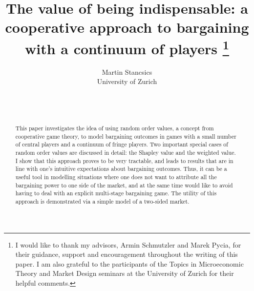 \documentclass[a4paper]{article}
\title{%
    The value of being indispensable: a cooperative approach to bargaining with a continuum of players%
    \thanks{
        I would like to thank my advisors, Armin Schmutzler and Marek Pycia, for their guidance, support and encouragement throughout the writing of this paper.
        I am also grateful to the participants of the Topics in Microeconomic Theory and Market Design seminars at the University of Zurich for their helpful comments.
    }
}
\author{Martin Stancsics \\ \normalsize{University of Zurich}}
\date{\thisdraft \\ \firstdraft \\ \latestversion}
\begin{document}
\maketitle

\begin{abstract}
    This paper investigates the idea of using random order values, a concept from cooperative game theory, to model bargaining outcomes in games with a small number of central players and a continuum of fringe players.
    Two important special cases of random order values are discussed in detail: the Shapley value and the weighted value.
    I show that this approach proves to be very tractable, and leads to results that are in line with one's intuitive expectations about bargaining outcomes.
    Thus, it can be a useful tool in modelling situations where one does not want to attribute all the bargaining power to one side of the market, and at the same time would like to avoid having to deal with an explicit multi-stage bargaining game.
    The utility of this approach is demonstrated via a simple model of a two-sided market.
\end{abstract}




\appendix

\printbibliography


\end{document}
